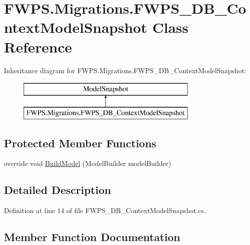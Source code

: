 \hypertarget{class_f_w_p_s_1_1_migrations_1_1_f_w_p_s___d_b___context_model_snapshot}{}\section{F\+W\+P\+S.\+Migrations.\+F\+W\+P\+S\+\_\+\+D\+B\+\_\+\+Context\+Model\+Snapshot Class Reference}
\label{class_f_w_p_s_1_1_migrations_1_1_f_w_p_s___d_b___context_model_snapshot}
Inheritance diagram for F\+W\+P\+S.\+Migrations.\+F\+W\+P\+S\+\_\+\+D\+B\+\_\+\+Context\+Model\+Snapshot\+:\begin{figure}[H]
\begin{center}
\leavevmode
\includegraphics[height=2.000000cm]{class_f_w_p_s_1_1_migrations_1_1_f_w_p_s___d_b___context_model_snapshot}
\end{center}
\end{figure}
\subsection*{Protected Member Functions}
\begin{DoxyCompactItemize}
\item 
override void \mbox{\hyperlink{class_f_w_p_s_1_1_migrations_1_1_f_w_p_s___d_b___context_model_snapshot_a8340cbfe63da8a2c9620a310df444183}{Build\+Model}} (Model\+Builder model\+Builder)
\end{DoxyCompactItemize}


\subsection{Detailed Description}


Definition at line 14 of file F\+W\+P\+S\+\_\+\+D\+B\+\_\+\+Context\+Model\+Snapshot.\+cs.



\subsection{Member Function Documentation}
\mbox{\label{class_f_w_p_s_1_1_migrations_1_1_f_w_p_s___d_b___context_model_snapshot_a8340cbfe63da8a2c9620a310df444183}} 
